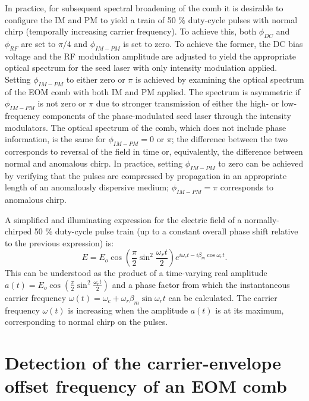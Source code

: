 In practice, for subsequent spectral broadening of the comb it is desirable to configure the IM and PM to yield a train of 50 $\%$ duty-cycle pulses with normal chirp (temporally increasing carrier frequency). To achieve this, both $\phi_{DC}$ and $\phi_{RF}$ are set to $\pi/4$ and $\phi_{IM-PM}$ is set to zero. To achieve the former, the DC bias voltage and the RF modulation amplitude are adjusted to yield the appropriate optical spectrum for the seed laser with only intensity modulation applied. Setting $\phi_{IM-PM}$ to either zero or $\pi$ is achieved by examining the optical spectrum of the EOM comb with both IM and PM applied. The spectrum is asymmetric if $\phi_{IM-PM}$ is not zero or $\pi$ due to stronger transmission of either the high- or low-frequency components of the phase-modulated seed laser through the intensity modulators. The optical spectrum of the comb, which does not include phase information, is the same for $\phi_{IM-PM}=0$ or $\pi$; the difference between the two corresponds to reversal of the field in time or, equivalently, the difference between normal and anomalous chirp. In practice, setting $\phi_{IM-PM}$ to zero can be achieved by verifying that the pulses are compressed by propagation in an appropriate length of an anomalously dispersive medium; $\phi_{IM-PM}=\pi$ corresponds to anomalous chirp.

A simplified and illuminating expression for the electric field of a normally-chirped 50 $\%$ duty-cycle pulse train (up to a constant overall phase shift relative to the previous expression) is:
\begin{equation}
E=E_o\cos\left(\frac{\pi}{2}\sin^2{\frac{\omega_rt}{2}}\right)e^{i\omega_ct-i\beta_m\cos{\omega_rt}}.
\end{equation}
This can be understood as the product of a time-varying real amplitude $a(t)=E_o\cos\left(\frac{\pi}{2}\sin^2{\frac{\omega_rt}{2}}\right)$ and a phase factor from which the instantaneous carrier frequency $\omega(t)=\omega_c+\omega_r\beta_m\sin{\omega_rt}$ can be calculated. The carrier frequency $\omega(t)$ is increasing when the amplitude $a(t)$ is at its maximum, corresponding to normal chirp on the pulses.


\section{Detection of the carrier-envelope offset frequency of an EOM comb}

